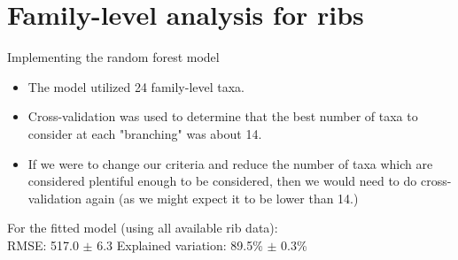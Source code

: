 \documentclass{beamer}
\begin{document}
\section[Ribs, family-level]{Family-level analysis for ribs}

\begin{frame}{Implementing the random forest model}

\begin{itemize}
\item The model utilized 24 family-level taxa.
\item Cross-validation was used to determine that the best number of taxa to
consider at each "branching" was about 14.
\item If we were to change our criteria and reduce the number of taxa which are
considered plentiful enough to be considered, then we would need to do
cross-validation again (as we might expect it to be lower than 14.)
\end{itemize}

\vspace{0.1in}

\noindent For the fitted model (using all available rib data):\\
\noindent RMSE: 517.0 $\pm$ 6.3  \hspace{0.05in}  Explained variation: 89.5\%
$\pm$ 0.3\%


\end{frame}
\end{document}
